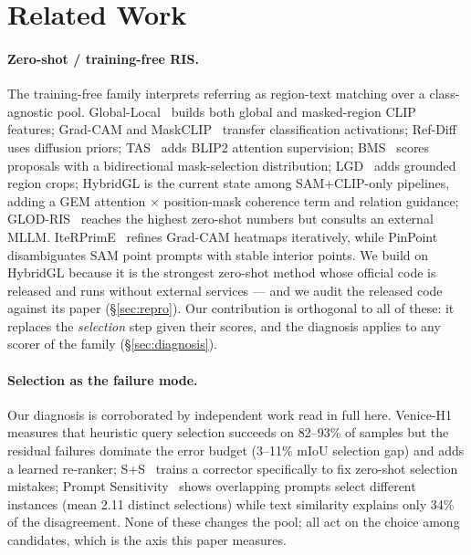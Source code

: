 \section{Related Work}
\label{sec:related}

\paragraph{Zero-shot / training-free RIS.}
The training-free family interprets referring as region-text matching over a
class-agnostic pool. Global-Local~\cite{yu2023global} builds both global and
masked-region CLIP features; Grad-CAM and MaskCLIP~\cite{zhou2022maskclip}
transfer classification activations; Ref-Diff~\cite{ni2023refdiff} uses
diffusion priors; TAS~\cite{shu2023tas} adds BLIP2 attention supervision;
BMS~\cite{bms2024} scores proposals with a bidirectional mask-selection
distribution; LGD~\cite{lgd2025} adds grounded region crops; HybridGL
\cite{hybridgl2025} is the current state among SAM+CLIP-only pipelines, adding
a GEM attention $\times$ position-mask coherence term and relation guidance;
GLOD-RIS~\cite{wu2026glodris} reaches the highest zero-shot numbers but
consults an external MLLM. IteRPrimE~\cite{iterprime2025} refines Grad-CAM
heatmaps iteratively, while PinPoint~\cite{pinpoint2026} disambiguates SAM
point prompts with stable interior points. We build on HybridGL because it is
the strongest zero-shot method whose official code is released and runs
without external services --- and we audit the released code against its
paper (\S\ref{sec:repro}). Our contribution is orthogonal to all of these: it
replaces the \emph{selection} step given their scores, and the diagnosis
applies to any scorer of the family (\S\ref{sec:diagnosis}).

\paragraph{Selection as the failure mode.}
Our diagnosis is corroborated by independent work read in full here.
Venice-H1~\cite{veniceh1_2026} measures that heuristic query selection
succeeds on 82--93\% of samples but the residual failures dominate the error
budget (3--11\% mIoU selection gap) and adds a learned re-ranker;
S+S~\cite{splus2024} trains a corrector specifically to fix zero-shot
selection mistakes; Prompt Sensitivity~\cite{promptsens2026} shows overlapping
prompts select different instances (mean 2.11 distinct selections) while text
similarity explains only 34\% of the disagreement. None of these changes the
pool; all act on the choice among candidates, which is the axis this paper
measures.

